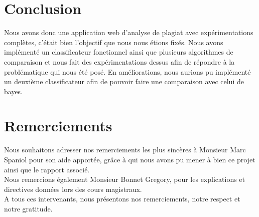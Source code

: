 \documentclass[french,12pt]{article}
\begin{document}
\section{Conclusion} \label{conclusion}
Nous avons donc une application web d'analyse de plagiat avec expérimentations complètes, c'était bien l'objectif que nous nous étions fixés.
Nous avons implémenté un classificateur fonctionnel ainsi que plusieurs algorithmes de comparaison et nous fait des expérimentations dessus afin de répondre à la problématique qui nous été posé.
En améliorations, nous aurions pu implémenté un deuxième classificateur afin de pouvoir faire une comparaison avec celui de bayes.

\section{Remerciements}
Nous souhaitons adresser nos remerciements les plus sincères à Monsieur Marc Spaniol pour son aide apportée, grâce à qui nous avons pu mener à bien ce projet ainsi que le rapport associé.\\
Nous remercions également Monsieur Bonnet Gregory, pour les explications et directives données lors des cours magistraux.\\

A tous ces intervenants, nous présentons nos remerciements, notre respect et notre gratitude.

\newpage
\end{document}
